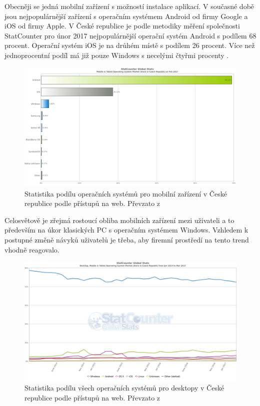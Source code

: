  Obecněji se jedná mobilní zařízení s možností instalace aplikací. V současné době jsou nejpopulárnější zařízení s operačním systémem Android od firmy Google a iOS od firmy Apple. V České republice je podle metodiky měření společnosti StatCounter pro únor 2017 nejpopulárnější operační systém Android s podílem 68 procent. Operační systém iOS je na drůhém místě s podílem 26 procent. Více než jednoprocentní podíl má již pouze Windows s necelými čtyřmi procenty \cite{HNAndroid}. 
 
 \begin{figure}[h]
\includegraphics[width=13cm]{img/StatCounter_MobileBar}
\caption{Statistika podílu operačních systémů pro mobilní zařízení v České republice podle přístupů na web. Převzato z \cite{Statcounter1}} 
\centering
\end{figure}%
 
Celosvětově je zřejmá rostoucí obliba mobilních zařízení mezi uživateli a to především na úkor klasických PC s operačním systémem Windows. Vzhledem k postupné změně návyků uživatelů je třeba, aby firemní prostředí na tento trend vhodně reagovalo. 


\begin{figure}[h]
\includegraphics[width=13cm]{img/StatCounter_VyvojVse}
\caption{Statistika podílu všech operačních systémů pro desktopy v České republice podle přístupů na web. Převzato z \cite{Statcounter1}} 
\centering
\end{figure}%

